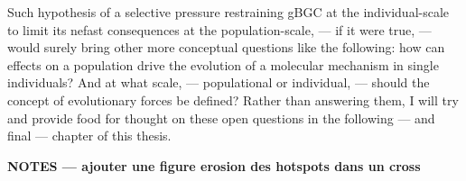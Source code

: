 Such hypothesis of a selective pressure restraining gBGC at the individual-scale to limit its nefast consequences at the population-scale, — if it were true, — would surely bring other more conceptual questions like the following:
how can effects on a population drive the evolution of a molecular mechanism in single individuals?
And at what scale, — populational or individual, — should the concept of evolutionary forces be defined?
Rather than answering them, I will try and provide food for thought on these open questions in the following — and final — chapter of this thesis.







\textbf{NOTES — ajouter une figure erosion des hotspots dans un cross}


